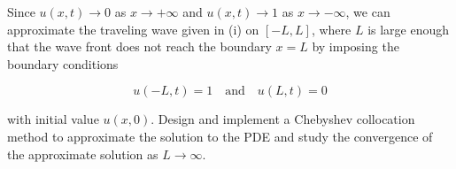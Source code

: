 Since $u(x, t) \to 0$ as $x \to +\infty$ and $u(x, t) \to 1$ as $x \to -\infty$, we can approximate the traveling wave
given in (i) on $[-L, L]$, where $L$ is large enough that the wave front does not reach the boundary $x = L$ by imposing
the boundary conditions

$$
u(-L, t) = 1 \quad \text{and} \quad u(L, t) = 0
$$

with initial value $u(x, 0)$. Design and implement a Chebyshev collocation method to approximate the solution to the
PDE and study the convergence of the approximate solution as $L \to \infty$.

\begin{solution}
    \ \\
    \vfill
\end{solution}